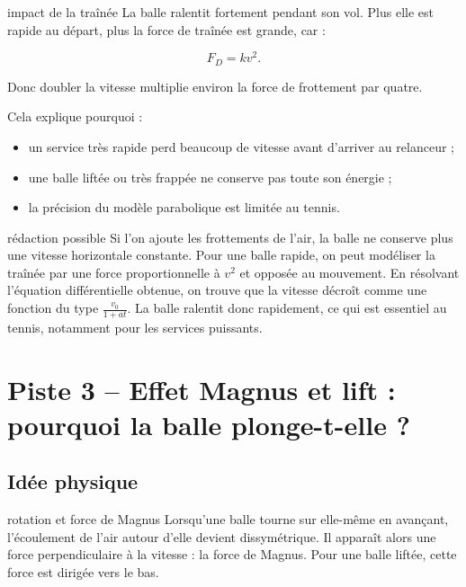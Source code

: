 \documentclass[11pt,a4paper]{article}
\begin{document}
\begin{tennis}{impact de la traînée}
La balle ralentit fortement pendant son vol. Plus elle est rapide au départ, plus la force de traînée est grande, car :

\[
F_D=kv^2.
\]

Donc doubler la vitesse multiplie environ la force de frottement par quatre.

Cela explique pourquoi :
\begin{itemize}
    \item un service très rapide perd beaucoup de vitesse avant d'arriver au relanceur ;
    \item une balle liftée ou très frappée ne conserve pas toute son énergie ;
    \item la précision du modèle parabolique est limitée au tennis.
\end{itemize}
\end{tennis}

\begin{oral}{rédaction possible}
Si l'on ajoute les frottements de l'air, la balle ne conserve plus une vitesse horizontale constante. Pour une balle rapide, on peut modéliser la traînée par une force proportionnelle à $v^2$ et opposée au mouvement. En résolvant l'équation différentielle obtenue, on trouve que la vitesse décroît comme une fonction du type $\frac{v_0}{1+at}$. La balle ralentit donc rapidement, ce qui est essentiel au tennis, notamment pour les services puissants.
\end{oral}

\section{Piste 3 -- Effet Magnus et lift : pourquoi la balle plonge-t-elle ?}

\subsection{Idée physique}

\begin{idee}{rotation et force de Magnus}
Lorsqu'une balle tourne sur elle-même en avançant, l'écoulement de l'air autour d'elle devient dissymétrique. Il apparaît alors une force perpendiculaire à la vitesse : la force de Magnus. Pour une balle liftée, cette force est dirigée vers le bas.
\end{idee}
\end{document}
